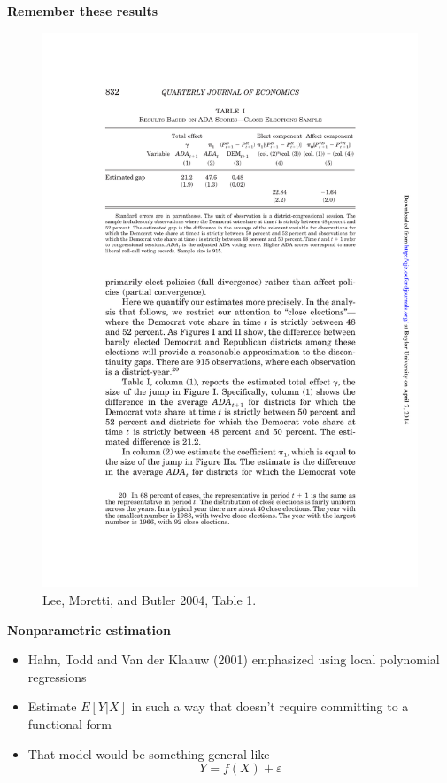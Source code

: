 \documentclass[notes=show]{beamer}
\begin{document}
\begin{frame}[plain]
	\begin{center}
	\textbf{Remember these results}
	\end{center}
	
	\begin{figure}
	\includegraphics[scale=0.75]{./lecture_includes/lee_table1.pdf}
	\caption{Lee, Moretti, and Butler 2004, Table 1.}
	\end{figure}
\end{frame}


\clearpage
\newpage

	
\begin{frame}[plain]
	\begin{center}
	\textbf{Nonparametric estimation}
	\end{center}
	
	\begin{itemize}
	\item Hahn, Todd and Van der Klaauw (2001) emphasized using local polynomial regressions
	\item Estimate $E[Y|X]$ in such a way that doesn't require committing to a functional form 
	\item That model would be something general like$$Y=f(X) + \varepsilon$$
	\end{itemize}
\end{frame}
\end{document}
